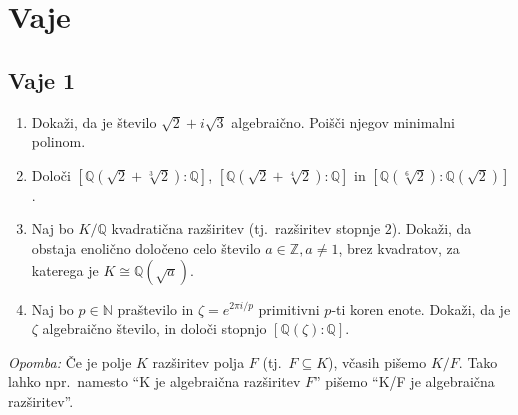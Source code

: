 \section{Vaje}
\subsection*{Vaje 1}

\begin{enumerate}
    \item Dokaži, da je število $\sqrt{2} + i\sqrt{3}$ algebraično. Poišči njegov minimalni polinom.

    \item Določi $[\mathbb{Q}(\sqrt{2} + \sqrt[3]{2}) \colon \mathbb{Q}]$, $[\mathbb{Q}(\sqrt{2} + 
    \sqrt[4]{2}) \colon \mathbb{Q}]$ in $[\mathbb{Q}(\sqrt[6]{2}) \colon \mathbb{Q}(\sqrt{2})]$.

    \item Naj bo $K/\mathbb{Q}$ kvadratična razširitev (tj.~razširitev stopnje $2$). 
    Dokaži, da obstaja enolično določeno celo število $a \in \mathbb{Z}, a \neq 1$, 
    brez kvadratov, za katerega je $K \cong \mathbb{Q}(\sqrt{a})$.

    \item Naj bo $p \in \mathbb{N}$ praštevilo in $\zeta = e^{2\pi i/p}$ primitivni $p$-ti koren enote. 
    Dokaži, da je $\zeta$ algebraično število, in določi stopnjo $[\mathbb{Q}(\zeta) \colon \mathbb{Q}]$.
\end{enumerate}

\textit{Opomba:} Če je polje $K$ razširitev polja $F$ (tj.~$F \subseteq K$), 
včasih pišemo $K/F$. Tako lahko npr.~namesto ``K je algebraična razširitev $F$'' pišemo 
``K/F je algebraična razširitev''.

\newpage